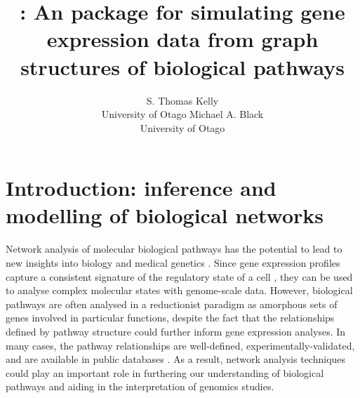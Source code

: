 \documentclass[article, shortnames]{jss}
\author{S. Thomas Kelly\\University of Otago
   \And Michael A. Black\\University of Otago}
\title{\pkg{graphsim}: An \proglang{R} package for simulating gene expression data from graph structures of biological pathways}
\begin{document}


\section[Introduction: inference and modelling of biological networks]{Introduction: inference and modelling of biological networks} \label{sec:intro}


Network analysis of molecular biological pathways has the potential to lead to new insights into biology and medical genetics \citep{Barabasi2004, Hu2016}. Since gene expression profiles capture a consistent signature of the regulatory state of a cell \citep{Perou2000, Ozsolak2011, Svensson2018}, they can be used to analyse complex molecular states with genome-scale data. However, biological pathways are often analysed in a reductionist paradigm as amorphous sets of genes involved in particular functions, despite the fact that the relationships defined by pathway structure could further inform gene expression analyses. In many cases, the pathway relationships are well-defined, experimentally-validated, and are available in public databases \citep{Reactome}. 
As a result, network analysis techniques could play an important role in furthering our understanding of biological pathways and aiding in the interpretation of genomics studies. %
\end{document}
